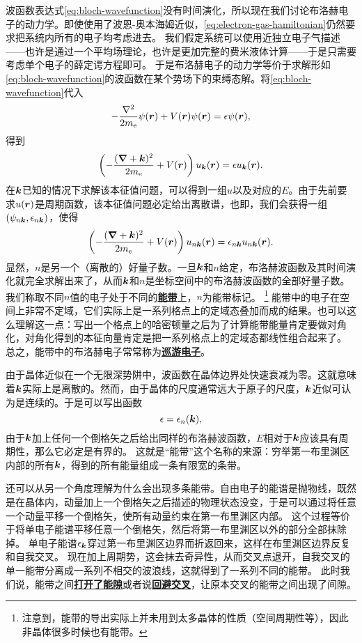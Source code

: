 \documentclass[hyperref, UTF8, a4paper]{ctexart}
\newcommand*{\concept}[1]{\underline{\textbf{#1}}}
\begin{document}
波函数表达式\eqref{eq:bloch-wavefunction}没有时间演化，所以现在我们讨论布洛赫电子的动力学。即使使用了波恩-奥本海姆近似，\eqref{eq:electron-gas-hamiltonian}仍然要求把系统内所有的电子均考虑进去。
我们假定系统可以使用近独立电子气描述——也许是通过一个平均场理论，也许是更加完整的费米液体计算——于是只需要考虑单个电子的薛定谔方程即可。
于是布洛赫电子的动力学等价于求解形如\eqref{eq:bloch-wavefunction}的波函数在某个势场下的束缚态解。将\eqref{eq:bloch-wavefunction}代入
\[
    -\frac{\laplacian}{2m_\text{e}} \psi(\vb*{r}) + V(\vb*{r}) \psi(\vb*{r}) = \epsilon \psi(\vb*{r}),
\]
得到
\begin{equation}
    \left( - \frac{(\grad+\vb*{k})^2}{2m_\text{e}} + V(\vb*{r}) \right) u_{\vb*{k}}(\vb*{r}) = \epsilon u_{\vb*{k}}(\vb*{r}).
    \label{eq:block-energy-problem}
\end{equation}
在$\vb*{k}$已知的情况下求解该本征值问题，可以得到一组$u$以及对应的$E$。由于先前要求$u(\vb*{r})$是周期函数，该本征值问题必定给出离散谱，也即，我们会获得一组$(\psi_{n \vb*{k}}, \epsilon_{n \vb*{k}})$，使得
\begin{equation}
    \left( - \frac{(\grad+\vb*{k})^2}{2m_\text{e}} + V(\vb*{r}) \right) u_{n \vb*{k}}(\vb*{r}) = \epsilon_{n \vb*{k}} u_{n \vb*{k}}(\vb*{r}).
\end{equation}
显然，$n$是另一个（离散的）好量子数。一旦$\vb*{k}$和$n$给定，布洛赫波函数及其时间演化就完全求解出来了，从而$\vb*{k}$和$n$是坐标空间中的布洛赫波函数的全部好量子数。我们称取不同$n$值的电子处于不同的\concept{能带}上，$n$为能带标记。%
\footnote{注意到，能带的导出实际上并未用到太多晶体的性质（空间周期性等），因此非晶体很多时候也有能带。}%
能带中的电子在空间上非常不定域，它们实际上是一系列格点上的定域态叠加而成的结果。也可以这么理解这一点：写出一个格点上的哈密顿量之后为了计算能带能量肯定要做对角化，对角化得到的本征向量肯定是把一系列格点上的定域态都线性组合起来了。
总之，能带中的布洛赫电子常常称为\concept{巡游电子}。

由于晶体近似在一个无限深势阱中，波函数在晶体边界处快速衰减为零。这就意味着$\vb*{k}$实际上是离散的。然而，由于晶体的尺度通常远大于原子的尺度，$\vb*{k}$近似可认为是连续的。于是可以写出函数
\[
    \epsilon = \epsilon_n(\vb*{k}),
\]
由于$\vb*{k}$加上任何一个倒格矢之后给出同样的布洛赫波函数，$E$相对于$\vb*{k}$应该具有周期性，那么它必定是有界的。
这就是“能带”这个名称的来源：穷举第一布里渊区内部的所有$\vb*{k}$，得到的所有能量组成一条有限宽的条带。

还可以从另一个角度理解为什么会出现多条能带。自由电子的能谱是抛物线，既然是在晶体内，动量加上一个倒格矢之后描述的物理状态没变，于是可以通过将任意一个动量平移一个倒格矢，使所有动量约束在第一布里渊区内部。
这个过程等价于将单电子能谱平移任意一个倒格矢，然后将第一布里渊区以外的部分全部抹除掉。
单电子能谱$\epsilon_{\vb*{k}}$穿过第一布里渊区边界而折返回来，这样在布里渊区边界反复和自我交叉。
现在加上周期势，这会抹去奇异性，从而交叉点退开，自我交叉的单一能带分离成一系列不相交的波浪线，这就得到了一系列不同的能带。
此时我们说，能带之间\concept{打开了能隙}或者说\concept{回避交叉}，让原本交叉的能带之间出现了间隙。
\end{document}

